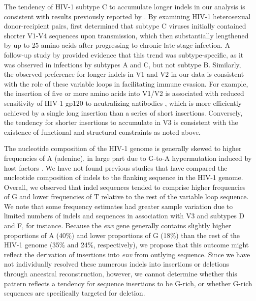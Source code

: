 \documentclass[12pt]{article}
\begin{document}

The tendency of HIV-1 subtype C to accumulate longer indels in our analysis is consistent with results previously reported by \citet{Derdeyn:2004}. %
By examining HIV-1 heterosexual donor-recipient pairs, \citet{Derdeyn:2004} first determined that subtype C viruses initially contained shorter V1-V4 sequences upon transmission, which then substantially lengthened by up to 25 amino acids after progressing to chronic late-stage infection. 
A follow-up study by \citet{Chohan:2005} provided evidence that this trend was subtype-specific, as it was observed in infections by subtypes A and C, but not subtype B.
Similarly, the observed preference for longer indels in V1 and V2 in our data is consistent with the role of these variable loops in facilitating immune evasion.
For example, the insertion of five or more amino acids into V1/V2 is associated with reduced sensitivity of HIV-1 gp120 to neutralizing antibodies \citep{Curlin:2010, Sagar:2006}, which is more efficiently achieved by a single long insertion than a series of short insertions. 
Conversely, the tendency for shorter insertions to accumulate in V3 is consistent with the existence of functional and structural constraints as noted above.



The nucleotide composition of the HIV-1 genome is generally skewed to higher frequencies of A (adenine), in large part due to G-to-A hypermutation induced by host factors \citep{Lidd2004apobec}.
We have not found previous studies that have compared the nucleotide composition of indels to the flanking sequence in the HIV-1 genome.
Overall, we observed that indel sequences tended to comprise higher frequencies of G and lower frequencies of T relative to the rest of the variable loop sequence.
We note that some frequency estimates had greater sample variation due to limited numbers of indels and sequences in association with V3 and subtypes D and F, for instance.
Because the \textit{env} gene generally contains slightly higher proportions of A (40\%) and lower proportions of G (18\%) than the rest of the HIV-1 genome (35\% and 24\%, respectively), we propose that this outcome might reflect the derivation of insertions into \textit{env} from outlying sequence.
Since we have not individually resolved these numerous indels into insertions or deletions through ancestral reconstruction, however, we cannot determine whether this pattern reflects a tendency for sequence insertions to be G-rich, or whether G-rich sequences are specifically targeted for deletion.
\end{document}
